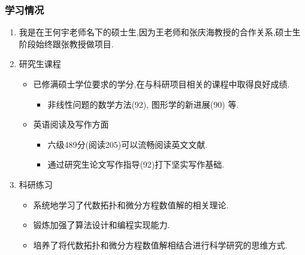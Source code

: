 \documentclass[UTF8]{ctexbeamer}	%
\theoremstyle{plain}
\theoremstyle{definition}
\theoremstyle{remark}
\numberwithin{equation}{section}
\begin{document}
\begin{frame}[fragile]
    \frametitle{学习情况}
\begin{enumerate}
    \item 我是在王何宇老师名下的硕士生,因为王老师和张庆海教授的合作关系,硕士生
    阶段始终跟张教授做项目.
    \item 研究生课程
    \begin{itemize}
        \item 已修满硕士学位要求的学分,在与科研项目相关的课程中取得良好成绩.
        \begin{itemize}
            \item 非线性问题的数学方法(92), 图形学的新进展(90) 等.
        \end{itemize}
        \item 英语阅读及写作方面
        \begin{itemize}
            \item 六级489分(阅读205)可以流畅阅读英文文献.
            \item 通过研究生论文写作指导(92)打下坚实写作基础.
        \end{itemize}
    \end{itemize}
    \item 科研练习
    \begin{itemize}
        \item 系统地学习了代数拓扑和微分方程数值解的相关理论.
        \item 锻炼加强了算法设计和编程实现能力.
        \item 培养了将代数拓扑和微分方程数值解相结合进行科学研究的思维方式.
    \end{itemize}
\end{enumerate}
\end{frame}
\end{document}
